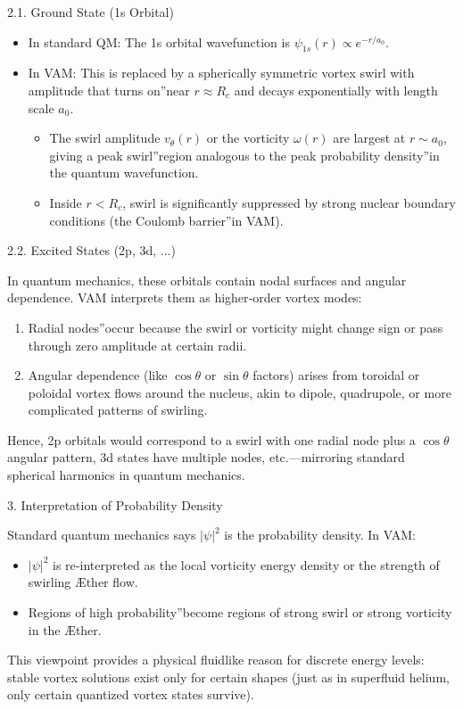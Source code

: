 \documentclass[a4paper,10pt]{article}
\begin{document}
2.1. Ground State (1s Orbital)

\begin{itemize}
    \item In standard QM: The 1s orbital wavefunction is \(\psi_{1s}(r) \propto e^{-r/a_0}\).
    \item In VAM: This is replaced by a spherically symmetric vortex swirl with amplitude that \grqq turns on\textquotedblright near \(r \approx R_c\) and decays exponentially with length scale \(a_0\).
        \begin{itemize}
        \item The swirl amplitude \(v_\theta(r)\) or the vorticity \(\omega(r)\) are largest at \(r \sim a_0\), giving a \grqq peak swirl\textquotedblright region analogous to the \grqq peak probability density\textquotedblright in the quantum wavefunction.
        \item Inside \(r < R_c\), swirl is significantly suppressed by strong nuclear boundary conditions (the \grqq Coulomb barrier\textquotedblright in VAM).
        \end{itemize}
\end{itemize}




2.2. Excited States (2p, 3d, ...)

In quantum mechanics, these orbitals contain nodal surfaces and angular dependence. VAM interprets them as higher‐order vortex modes:

\begin{enumerate}
\item Radial \grqq nodes\textquotedblright occur because the swirl or vorticity might change sign or pass through zero amplitude at certain radii.
\item Angular dependence (like \(\cos\theta\) or \(\sin\theta\) factors) arises from toroidal or poloidal vortex flows around the nucleus, akin to dipole, quadrupole, or more complicated patterns of swirling.
\end{enumerate}
Hence, 2p orbitals would correspond to a swirl with one radial node plus a \(\cos\theta\) angular pattern, 3d states have multiple nodes, etc.—mirroring standard spherical harmonics in quantum mechanics.


3. Interpretation of Probability Density

Standard quantum mechanics says \(|\psi|^2\) is the probability density. In VAM:

\begin{itemize}
\item \(|\psi|^2\) is re‐interpreted as the local vorticity energy density or the strength of swirling Æther flow.
\item Regions of \grqq high probability\textquotedblright become regions of strong swirl or strong vorticity in the Æther.
\end{itemize}
This viewpoint provides a physical fluidlike reason for discrete energy levels: stable vortex solutions exist only for certain shapes (just as in superfluid helium, only certain quantized vortex states survive).
\end{document}
